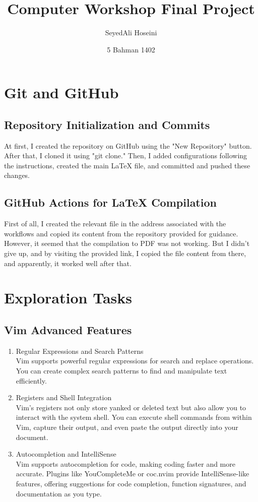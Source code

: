 \documentclass[titlepage]{article}
\title{Computer Workshop Final Project}
\author{SeyedAli Hoseini}
\date{5 Bahman 1402}
\begin{document}
\maketitle
\tableofcontents

\newpage

\section{Git and GitHub}
\subsection{Repository Initialization and Commits}
At first, I created the repository on GitHub using the "New Repository" button. After that, I cloned it using "git clone." Then, I added configurations following the instructions, created the main LaTeX file, and committed and pushed these changes.

\subsection{GitHub Actions for LaTeX Compilation}
First of all, I created the relevant file in the address associated with the workflows and copied its content from the repository provided for guidance. However, it seemed that the compilation to PDF was not working. But I didn't give up, and by visiting the provided link, I copied the file content from there, and apparently, it worked well after that.

\newpage

\section{Exploration Tasks}
\subsection{Vim Advanced Features}
\begin{enumerate}
    \item Regular Expressions and Search Patterns\\
    Vim supports powerful regular expressions for search and replace operations. You can create complex search patterns to find and manipulate text efficiently.

    \item Registers and Shell Integration\\
    Vim's registers not only store yanked or deleted text but also allow you to interact with the system shell. You can execute shell commands from within Vim, capture their output, and even paste the output directly into your document.

    \item Autocompletion and IntelliSense\\
    Vim supports autocompletion for code, making coding faster and more accurate. Plugins like YouCompleteMe or coc.nvim provide IntelliSense-like features, offering suggestions for code completion, function signatures, and documentation as you type.
\end{enumerate}
\end{document}
